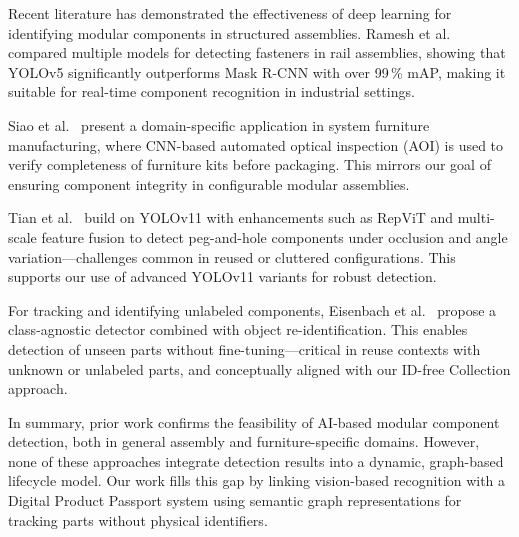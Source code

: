 \documentclass[3p,times,procedia]{elsarticle}
\begin{document}
Recent literature has demonstrated the effectiveness of deep learning for identifying modular components in structured assemblies. Ramesh et al.~\cite{ramesh2024investigation} compared multiple models for detecting fasteners in rail assemblies, showing that YOLOv5 significantly outperforms Mask R-CNN with over 99\,\% mAP, making it suitable for real-time component recognition in industrial settings.

Siao et al.~\cite{siao2024furniture} present a domain-specific application in system furniture manufacturing, where CNN-based automated optical inspection (AOI) is used to verify completeness of furniture kits before packaging. This mirrors our goal of ensuring component integrity in configurable modular assemblies.

Tian et al.~\cite{tian2025inspection} build on YOLOv11 with enhancements such as RepViT and multi-scale feature fusion to detect peg-and-hole components under occlusion and angle variation—challenges common in reused or cluttered configurations. This supports our use of advanced YOLOv11 variants for robust detection.

For tracking and identifying unlabeled components, Eisenbach et al.~\cite{eisenbach2024} propose a class-agnostic detector combined with object re-identification. This enables detection of unseen parts without fine-tuning—critical in reuse contexts with unknown or unlabeled parts, and conceptually aligned with our ID-free Collection approach.

In summary, prior work confirms the feasibility of AI-based modular component detection, both in general assembly and furniture-specific domains. However, none of these approaches integrate detection results into a dynamic, graph-based lifecycle model. Our work fills this gap by linking vision-based recognition with a Digital Product Passport system using semantic graph representations for tracking parts without physical identifiers.



\end{document}
